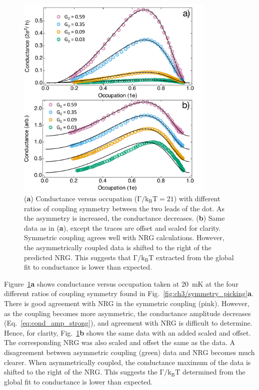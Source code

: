 \begin{figure}[!bht]
 \begin{center}
 \includegraphics[width=0.85\textwidth]{figures/ch3/figure19.pdf}
 \caption[Conductance versus Occupation : Varying Coupling Symmetry]{\label{fig:ch3/cond_occ_assymetry} 
 (\textbf{a}) Conductance versus occupation ($\mathrm{\Gamma/k_BT=21}$) with different ratios of coupling symmetry between the two leads of the dot. As the asymmetry is increased, the conductance decreases.
 (\textbf{b}) Same data as in (\textbf{a}), except the traces are offset and scaled for clarity. Symmetric coupling agrees well with NRG calculations. However, the asymmetrically coupled data is shifted to the right of the predicted NRG. This suggests that $\mathrm{\Gamma/k_BT}$ extracted from the global fit to conductance is lower than expected.}
 \end{center}
\end{figure}


Figure~\ref{fig:ch3/cond_occ_assymetry}\textbf{a} shows conductance versus occupation taken at \qty{20}{mK} at the four different ratios of coupling symmetry found in Fig.~\ref{fig:ch3/symmetry_picking}\textbf{a}. There is good agreement with NRG in the symmetric coupling (pink). However, as the coupling becomes more asymmetric, the conductance amplitude decreases (Eq.~\ref{eq:cond_amp_strong}), and agreement with NRG is difficult to determine. Hence, for clarity, Fig.~\ref{fig:ch3/cond_occ_assymetry}\textbf{b} shows the same data with an added scaled and offset. The corresponding NRG was also scaled and offset the same as the data. A disagreement between asymmetric coupling (green) data and NRG becomes much clearer. When asymmetrically coupled, the conductance maximum of the data is shifted to the right of the NRG. This suggests the $\mathrm{\Gamma/k_BT}$ determined from the global fit to conductance is lower than expected. 



